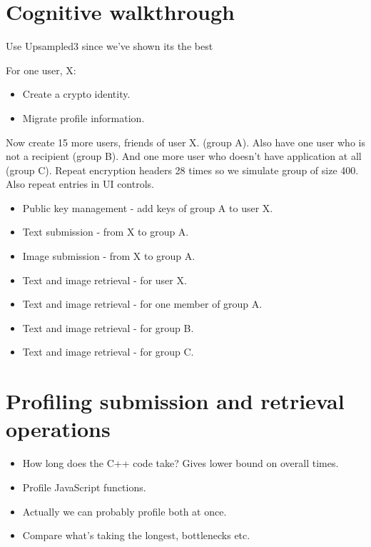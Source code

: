 \section{Cognitive walkthrough}

Use Upsampled3 since we've shown its the best

For one user, X:

\begin{itemize}
    \item Create a crypto identity.
    \item Migrate profile information.
\end{itemize}

Now create 15 more users, friends of user X. (group A). Also have one user who is not a recipient (group B). And one more user who doesn't have application at all (group C). Repeat encryption headers 28 times so we simulate group of size 400. Also repeat entries in UI controls.

\begin{itemize}
    \item Public key management - add keys of group A to user X.
    \item Text submission - from X to group A.
    \item Image submission - from X to group A.
    \item Text and image retrieval - for user X.
    \item Text and image retrieval - for one member of group A.
    \item Text and image retrieval - for group B.
    \item Text and image retrieval - for group C.
\end{itemize}

\section{Profiling submission and retrieval operations}

\begin{itemize}
    \item How long does the C++ code take? Gives lower bound on overall times.
    \item Profile JavaScript functions.
    \item Actually we can probably profile both at once.
    \item Compare what's taking the longest, bottlenecks etc.
\end{itemize}